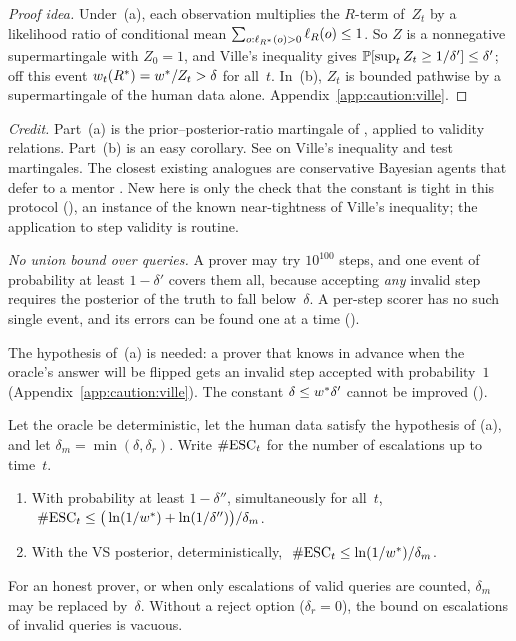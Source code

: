 \begin{proof}[Proof idea]
Under~(a), each observation multiplies the $R$-term of~$Z_t$ by a likelihood ratio of conditional mean $\sum_{o:\ell_{R^{*}}(o)>0}\ell_R(o)\le1$. So $Z$ is a nonnegative supermartingale with $Z_0=1$, and Ville's inequality \citep{ville1939etude} gives $\mathbb{P}[\sup_tZ_t\ge1/\delta']\le\delta'$; off this event $w_t(R^{*})=w^{*}/Z_t>\delta$ for all~$t$. In~(b), $Z_t$ is bounded pathwise by a supermartingale of the human data alone. Appendix~\ref{app:caution:ville}.
\end{proof}

\emph{Credit.} Part~(a) is the prior--posterior-ratio martingale of \citet{waudbysmith2020confidence}, applied to validity relations. Part~(b) is an easy corollary. See \citet{ville1939etude,shafer2011test,ramdas2023game} on Ville's inequality and test martingales. The closest existing analogues are conservative Bayesian agents that defer to a mentor \citep{cohen2020pessimism,cohen2022fully}. New here is only the check that the constant is tight in this protocol (), an instance of the known near-tightness of Ville's inequality; the application to step validity is routine.

\emph{No union bound over queries.} A prover may try $10^{100}$ steps, and one event of probability at least $1-\delta'$ covers them all, because accepting \emph{any} invalid step requires the posterior of the truth to fall below~$\delta$. A per-step scorer has no such single event, and its errors can be found one at a time ().

The hypothesis of~(a) is needed: a prover that knows in advance when the oracle's answer will be flipped gets an invalid step accepted with probability~$1$ (Appendix~\ref{app:caution:ville}). The constant $\delta\le w^{*}\delta'$ cannot be improved ().

\begin{theorem}\label{thm:caution:bayesesc}
Let the oracle be deterministic, let the human data satisfy the hypothesis of (a), and let $\delta_m=\min(\delta,\delta_r)$. Write $\#\mathrm{ESC}_t$ for the number of escalations up to time~$t$.
\begin{enumerate}[label=(\roman*)]
\item With probability at least $1-\delta''$, simultaneously for all~$t$, $\ \nesc_t\le\big(\ln(1/\wstar)+\ln(1/\delta'')\big)/\delta_m$.
\item With the VS posterior, deterministically, $\ \nesc_t\le\ln(1/\wstar)/\delta_m$.
\end{enumerate}
For an honest prover, or when only escalations of valid queries are counted, $\delta_m$ may be replaced by~$\delta$. Without a reject option ($\delta_r=0$), the bound on escalations of invalid queries is vacuous.
\end{theorem}

